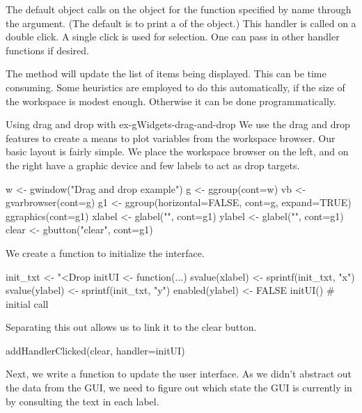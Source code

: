 The default  object calls
 on the object for the function specified by name
through the  argument. (The default is
to print a  of the object.) This handler is called on a
double click. A single click is used for selection. One can pass in
other handler functions if desired.  


The  method will update the list of items
being displayed.  This can be time consuming. Some heuristics
are employed to do this automatically, if the size of the workspace is
modest enough. Otherwise it can be done programmatically.

\begin{example}{Using drag and drop with }{ex-gWidgets-drag-and-drop}
  We use the drag and drop features to create a means to plot
  variables from the workspace browser.  Our basic layout is fairly
  simple. We place the workspace browser on the left, and on the right
  have a graphic device and few labels to act as drop targets.
\begin{Schunk}
\begin{Sinput}
 w <- gwindow("Drag and drop example")
 g <- ggroup(cont=w)
 vb <- gvarbrowser(cont=g)
 g1 <- ggroup(horizontal=FALSE, cont=g, expand=TRUE)
 ggraphics(cont=g1)
 xlabel <- glabel("", cont=g1)
 ylabel <- glabel("", cont=g1)
 clear <- gbutton("clear", cont=g1)
\end{Sinput}
\end{Schunk}
%
We create a function to initialize the interface.
\begin{Schunk}
\begin{Sinput}
 init_txt <- "<Drop %
 initUI <- function(...) {
   svalue(xlabel) <- sprintf(init_txt, "x")
   svalue(ylabel) <- sprintf(init_txt, "y")
   enabled(ylabel) <- FALSE
 }
 initUI()                                # initial call
\end{Sinput}
\end{Schunk}
%
Separating this out allows us to link it to the clear button.
\begin{Schunk}
\begin{Sinput}
 addHandlerClicked(clear, handler=initUI)
\end{Sinput}
\end{Schunk}
%
Next, we write a function to update the user interface. As we didn't
abstract out the data from the GUI, we need to figure out which state
the GUI is currently in by consulting the text in each
label.

\end{example}
